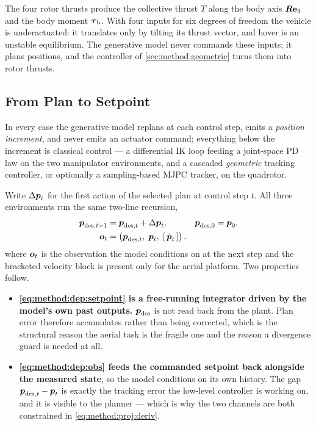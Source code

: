 The four rotor thrusts produce the collective thrust $T$ along the body axis $\boldsymbol{R}\textbf{e}_{3}$ and
the body moment $\boldsymbol{\tau}_{\textrm{b}}$. With four inputs for six degrees of freedom the vehicle is
underactuated: it translates only by tilting its thrust vector, and hover is an unstable equilibrium.
The generative model never commands these inputs; it plans positions, and the controller of
\autoref{sec:method:geometric} turns them into rotor thrusts.

\subsection{From Plan to Setpoint}\label{sec:method:setpoint}

In every case the generative model replans at each control step, emits a \emph{position increment},
and never emits an actuator command; everything below the increment is classical control --- a
differential \ac{IK} loop feeding a joint-space PD law on the two manipulator environments, and a
cascaded \emph{geometric} tracking controller, or optionally a sampling-based \ac{MJPC} tracker, on
the quadrotor.

Write $\Delta\boldsymbol{p}_{t}$ for the first action of the selected plan at control step $t$. All three
environments run the same two-line recursion,
\begin{align}
  \boldsymbol{p}_{\textrm{des},t+1} &= \boldsymbol{p}_{\textrm{des},t} + \Delta\boldsymbol{p}_{t},
    &&\boldsymbol{p}_{\textrm{des},0} = \boldsymbol{p}_{0},
    \label{eq:method:dep:setpoint}\\
  \boldsymbol{o}_{t} &= \left(\boldsymbol{p}_{\textrm{des},t},\;\boldsymbol{p}_{t},\;[\,\dot{\boldsymbol{p}}_{t}\,]\right),
    \label{eq:method:dep:obs}
\end{align}
where $\boldsymbol{o}_{t}$ is the observation the model conditions on at the next step and the bracketed
velocity block is present only for the aerial platform. Two properties follow.

\begin{itemize}
  \item \textbf{\eqref{eq:method:dep:setpoint} is a free-running integrator driven by the model's own
    past outputs.} $\boldsymbol{p}_{\textrm{des}}$ is not read back from the plant. Plan error therefore
    accumulates rather than being corrected, which is the structural reason the aerial task is the
    fragile one and the reason a divergence guard is needed at all.
  \item \textbf{\eqref{eq:method:dep:obs} feeds the commanded setpoint back alongside the measured
    state}, so the model conditions on its own history. The gap
    $\boldsymbol{p}_{\textrm{des},t} - \boldsymbol{p}_{t}$ is exactly the tracking error the low-level controller is
    working on, and it is visible to the planner --- which is why the two channels are both
    constrained in \eqref{eq:method:proj:deriv}.
\end{itemize}

